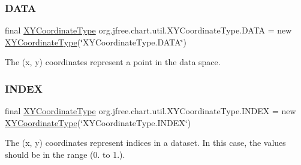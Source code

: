 \subsubsection{\texorpdfstring{D\+A\+TA}{DATA}}
{\footnotesize\ttfamily final \mbox{\hyperlink{classorg_1_1jfree_1_1chart_1_1util_1_1_x_y_coordinate_type}{X\+Y\+Coordinate\+Type}} org.\+jfree.\+chart.\+util.\+X\+Y\+Coordinate\+Type.\+D\+A\+TA = new \mbox{\hyperlink{classorg_1_1jfree_1_1chart_1_1util_1_1_x_y_coordinate_type}{X\+Y\+Coordinate\+Type}}(\char`\"{}X\+Y\+Coordinate\+Type.\+D\+A\+TA\char`\"{})\hspace{0.3cm}{\ttfamily [static]}}

The (x, y) coordinates represent a point in the data space. \mbox{\label{classorg_1_1jfree_1_1chart_1_1util_1_1_x_y_coordinate_type_a5832c6586ced976733cca3ebdf89d0f0}} 
\subsubsection{\texorpdfstring{I\+N\+D\+EX}{INDEX}}
{\footnotesize\ttfamily final \mbox{\hyperlink{classorg_1_1jfree_1_1chart_1_1util_1_1_x_y_coordinate_type}{X\+Y\+Coordinate\+Type}} org.\+jfree.\+chart.\+util.\+X\+Y\+Coordinate\+Type.\+I\+N\+D\+EX = new \mbox{\hyperlink{classorg_1_1jfree_1_1chart_1_1util_1_1_x_y_coordinate_type}{X\+Y\+Coordinate\+Type}}(\char`\"{}X\+Y\+Coordinate\+Type.\+I\+N\+D\+EX\char`\"{})\hspace{0.3cm}{\ttfamily [static]}}

The (x, y) coordinates represent indices in a dataset. In this case, the values should be in the range (0. to 1.). \mbox{\label{classorg_1_1jfree_1_1chart_1_1util_1_1_x_y_coordinate_type_a725eacbcd221bcc7551ad835d2073d21}} 

